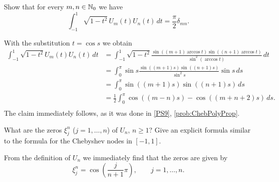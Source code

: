 \begin{problem}
\begin{subproblem}[2]\label{subpb:orthogonal}
Show that for every $m,n\in\mathbb{N}_0$ we have
\[
\int_{-1}^1 \sqrt{1-t^2}\,U_m(t) U_n(t)\,dt=\frac{\pi}{2}\delta_{mn}.
\]
\begin{solution}
With the substitution $t=\cos s$ we obtain
\[
\begin{split}
\int_{-1}^1 \sqrt{1-t^2}U_m(t) U_n(t)\,dt &= \int_{-1}^1 \sqrt{1-t^2}  \frac{\sin((m+1)\arccos t)\sin((n+1)\arccos t)}{\sin^2(\arccos t)}\,dt \\
&=  \int_{0}^\pi \sin s  \frac{\sin((m+1)s)\sin((n+1)s)}{\sin^2 s}\sin s\,ds \\
&=  \int_{0}^\pi  \sin((m+1)s)\sin((n+1)s)\,ds \\
&=\frac{1}{2} \int_{0}^\pi  \cos((m-n)s) - \cos((m+n+2)s)\,ds. \\
\end{split}
\]
The claim immediately follows, as it was done in \ref{PS9}, \ref{prob:ChebPolyProp}.
\end{solution}
\end{subproblem}

\begin{subproblem}[1]
What are the zeros $\xi^n_j$ ($j=1,\dots,n$) of $U_n$, $n\ge 1$? Give an explicit formula similar to the formula for the Chebyshev nodes in $[-1,1]$.
\begin{solution}
From the definition of $U_n$ we immediately find that the zeros are given by
\begin{equation}\label{eq:zeros}
\xi^n_j= \cos\left(\frac{j}{n+1}\pi\right),\qquad j=1,\dots,n.
\end{equation}
\end{solution}
\end{subproblem}


\end{problem}
